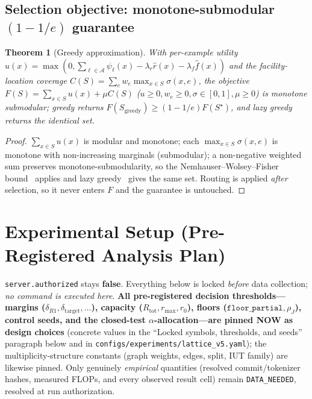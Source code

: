 \documentclass[11pt]{article}
\newtheorem{theorem}{Theorem}
\theoremstyle{definition}
\newcommand{\Aset}{\mathcal{A}}
\newcommand{\Rtot}{R_{\mathrm{tot}}}
\newcommand{\rmax}{r_{\max}}
\begin{document}
\subsection{Selection objective: monotone-submodular $(1-1/e)$ guarantee}
\begin{theorem}[Greedy approximation]
\label{thm:submod}
With per-example utility $u(x)=\max(0,\sum_{\ell\in\Aset}\psi_\ell(x)-\lambda_r\hat r(x)-
\lambda_f\hat f(x))$ and the facility-location coverage $C(S)=\sum_{e}w_e\max_{x\in S}
\sigma(x,e)$, the objective $F(S)=\sum_{x\in S}u(x)+\mu C(S)$ ($u\ge0,w_e\ge0,\sigma\in[0,1],
\mu\ge0$) is monotone submodular; greedy returns $F(S_{\mathrm{greedy}})\ge(1-1/e)F(S^\star)$,
and lazy greedy returns the identical set.
\end{theorem}
\begin{proof}
$\sum_{x\in S}u(x)$ is modular and monotone; each $\max_{x\in S}\sigma(x,e)$ is monotone
with non-increasing marginals (submodular); a non-negative weighted sum preserves
monotone-submodularity, so the Nemhauser--Wolsey--Fisher
bound~\cite{nemhauser1978submodular} applies and lazy greedy~\cite{minoux1978accelerated}
gives the same set. Routing is applied \emph{after} selection, so it never enters $F$ and
the guarantee is untouched.
\end{proof}

\section{Experimental Setup (Pre-Registered Analysis Plan)}
\label{sec:setup}
\texttt{server.authorized} stays \textbf{false}. Everything below is locked \emph{before}
data collection; \emph{no command is executed here}. \textbf{All pre-registered decision
thresholds---margins ($\delta_{R1},\delta_{\mathrm{target}},\dots$), capacity
($\Rtot,\rmax,r_0$), floors ($\texttt{floor\_partial},\rho_J$), control seeds, and the
closed-test $\alpha$-allocation---are pinned NOW as design choices} (concrete values in the
``Locked symbols, thresholds, and seeds'' paragraph below and in
\texttt{configs/experiments/lattice\_v5.yaml}); the multiplicity-structure constants
(graph weights, edges, split, IUT family) are likewise pinned. Only genuinely
\emph{empirical} quantities (resolved commit/tokenizer hashes, measured FLOPs, and every
observed result cell) remain \texttt{DATA\_NEEDED}, resolved at run authorization.
\end{document}
